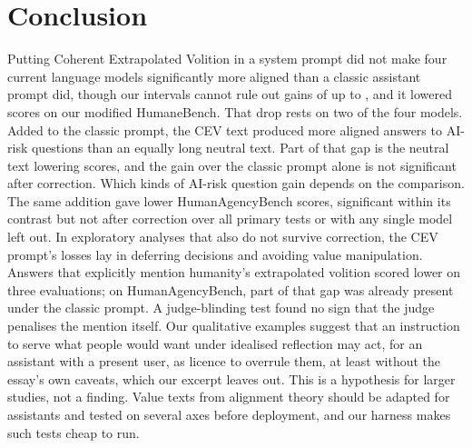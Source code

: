 \section{Conclusion}
\label{sec:conclusion}

Putting Coherent Extrapolated Volition in a system prompt did not make four current language models significantly
more aligned than a classic assistant prompt did, though our intervals cannot rule out gains of up to
\RCevClassicCiHighMax{}, and it lowered scores on our modified HumaneBench. That drop rests on two of the four models.
Added to the classic prompt, the CEV text produced more aligned answers to AI-risk questions than an equally long
neutral text. Part of that gap is the neutral text lowering scores, and the gain over the classic prompt alone is not
significant after correction. Which kinds of AI-risk question gain depends on the comparison. The same addition gave
lower HumanAgencyBench scores, significant within its contrast but not after correction over all primary tests or
with any single model left out. In exploratory analyses that also do not
survive correction, the CEV prompt's losses lay in deferring decisions and avoiding value manipulation. Answers that
explicitly mention humanity's extrapolated volition scored lower on three evaluations; on HumanAgencyBench, part of
that gap was already present under the classic prompt. A judge-blinding test found no sign that the judge penalises the mention itself.
Our qualitative examples suggest that an instruction to serve what people would want under idealised reflection may
act, for an assistant with a present user, as licence to overrule them, at least without the essay's own caveats,
which our excerpt leaves out. This is a hypothesis for larger studies, not
a finding. Value texts from alignment theory should be adapted for assistants and tested on several axes before
deployment, and our harness makes such tests cheap to run.
